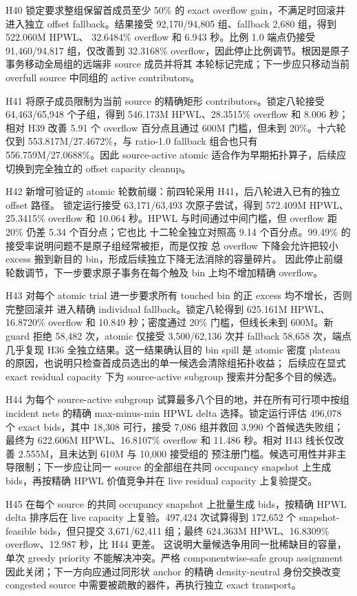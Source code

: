 \documentclass[UTF8,a4paper,11pt]{ctexart}
\begin{document}
H40 锁定要求整组保留首成员至少 50\% 的 exact overflow gain，不满足时回滚并进入独立
offset fallback。结果接受 92,170/94,805 组、fallback 2,680 组，得到 522.060M HPWL、
32.6484\% overflow 和 6.943 秒。比例 1.0 端点仍接受 91,460/94,817 组，仅改善到
32.3168\% overflow，因此停止比例调节。根因是原子事务移动全局组的远端非 source 成员并将其
本轮标记完成；下一步应只移动当前 overfull source 中同组的 active contributors。

H41 将原子成员限制为当前 source 的精确矩形 contributors。锁定八轮接受
64,463/65,948 个子组，得到 546.173M HPWL、28.3515\% overflow 和 8.006 秒；相对
H39 改善 5.91 个 overflow 百分点且通过 600M 门槛，但未到 20\%。十六轮仅到
553.817M/27.4672\%，与 ratio-1.0 fallback 组合也只有 556.759M/27.0688\%。因此
source-active atomic 适合作为早期拓扑算子，后续应切换到完全独立的 offset capacity cleanup。

H42 新增可验证的 atomic 轮数前缀：前四轮采用 H41，后八轮进入已有的独立 offset 路径。
锁定运行接受 63,171/63,493 次原子尝试，得到 572.409M HPWL、25.3415\% overflow 和
10.064 秒。HPWL 与时间通过中间门槛，但 overflow 距 20\% 仍差 5.34 个百分点；它也比
十二轮全独立对照高 9.14 个百分点。99.49\% 的接受率说明问题不是原子组经常被拒，而是仅按
总 overflow 下降会允许把较小 excess 搬到新目的 bin，形成后续独立下降无法消除的容量碎片。
因此停止前缀轮数调节，下一步要求原子事务在每个触及 bin 上均不增加精确 overflow。

H43 对每个 atomic trial 进一步要求所有 touched bin 的正 excess 均不增长，否则完整回滚并
进入精确 individual fallback。锁定八轮得到 625.161M HPWL、16.8720\% overflow 和
10.849 秒；密度通过 20\% 门槛，但线长未到 600M。新 guard 拒绝 58,482 次，atomic 仅接受
3,500/62,136 次并 fallback 58,658 次，端点几乎复现 H36 全独立结果。这一结果确认目的 bin
spill 是 atomic 密度 plateau 的原因，也说明只检查首成员选出的单一候选会清除组拓扑收益；
后续应在显式 exact residual capacity 下为 source-active subgroup 搜索并分配多个目的候选。

H44 为每个 source-active subgroup 试算最多八个目的地，并在所有可行项中按组 incident nets
的精确 max-minus-min HPWL delta 选择。锁定运行评估 496,078 个 exact bids，其中 18,308
可行，接受 7,086 组并救回 3,990 个首候选失败组；最终为 622.606M HPWL、16.8107\%
overflow 和 11.486 秒。相对 H43 线长仅改善 2.555M，且未达到 610M 与 10,000 接受组的
预注册门槛。候选可用性并非主导限制；下一步应让同一 source 的全部组在共同 occupancy
snapshot 上生成 bids，再按精确 HPWL 价值竞争并在 live residual capacity 上复验提交。

H45 在每个 source 的共同 occupancy snapshot 上批量生成 bids，按精确 HPWL delta 排序后在
live capacity 上复验。497,424 次试算得到 172,652 个 snapshot-feasible bids，但只提交
3,671/62,411 组；最终 624.363M HPWL、16.8309\% overflow、12.987 秒，比 H44 更差。
这说明大量候选争用同一批稀缺目的容量，单次 greedy priority 不能解决冲突。严格
componentwise-safe group assignment 因此关闭；下一方向应通过同形状 anchor 的精确
density-neutral 身份交换改变 congested source 中需要被疏散的器件，再执行独立 exact transport。
\end{document}
